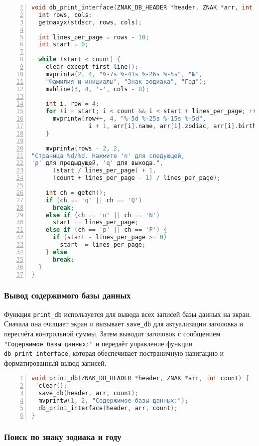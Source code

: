 \begin{lstlisting}[language=C, caption=Функция db\_print\_interface, numbers=left]
void db_print_interface(ZNAK_DB_HEADER *header, ZNAK *arr, int count) {
  int rows, cols;
  getmaxyx(stdscr, rows, cols);
  
  int lines_per_page = rows - 10;
  int start = 0;
  
  while (start < count) {
    clear_except_first_line();
    mvprintw(2, 4, "%-7s %-41s %-26s %-5s", "№", 
    "Фамилия и инициалы", "Знак зодиака", "Год");
    mvhline(3, 4, '-', cols - 8);

    int i, row = 4;
    for (i = start; i < count && i < start + lines_per_page; ++i) {
      mvprintw(row++, 4, "%-5d %-25s %-15s %-5d",
                i + 1, arr[i].name, arr[i].zodiac, arr[i].birth_year);
    }

    mvprintw(rows - 2, 2,
"Страница %d/%d. Нажмите 'n' для следующей, 
'p' для предыдущей, 'q' для выхода.",
      (start / lines_per_page) + 1,
      (count + lines_per_page - 1) / lines_per_page);

    int ch = getch();
    if (ch == 'q' || ch == 'Q')
      break;
    else if (ch == 'n' || ch == 'N')
      start += lines_per_page;
    else if (ch == 'p' || ch == 'P') {
      if (start - lines_per_page >= 0)
        start -= lines_per_page;
    } else
      break;
  }
}
\end{lstlisting}

\subsubsection*{Вывод содержимого базы данных}

Функция \texttt{print\_db} используется для вывода всех записей базы данных на экран. Сначала она очищает экран и вызывает \texttt{save\_db} для актуализации заголовка и пересчёта контрольной суммы. Затем выводит заголовок с сообщением \texttt{"Содержимое базы данных:"} и передаёт управление функции \texttt{db\_print\_interface}, которая обеспечивает постраничную навигацию и форматированный вывод записей.

\begin{lstlisting}[language=C, caption=Функция print\_db, numbers=left]
void print_db(ZNAK_DB_HEADER *header, ZNAK *arr, int count) {
  clear();
  save_db(header, arr, count);
  mvprintw(1, 2, "Содержимое базы данных:");
  db_print_interface(header, arr, count);
}
\end{lstlisting}

\subsubsection*{Поиск по знаку зодиака и году}

